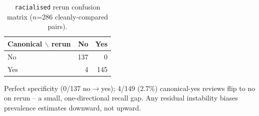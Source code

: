 \begin{table}[htbp]
\centering
\footnotesize
\setlength{\tabcolsep}{4pt}
\caption{\texttt{racialised} rerun confusion matrix ($n$=286 cleanly-compared pairs).}
\label{tab:robustness-confusion}
\begin{tabular}{@{} l r r @{}}
\toprule
Canonical $\backslash$ rerun & No & Yes \\
\midrule
No & 137 & 0 \\
Yes & 4 & 145 \\
\bottomrule
\end{tabular}

\vspace{2pt}
\raggedright\footnotesize
Perfect specificity (0/137 no$\to$yes); 4/149 (2.7\%) canonical-yes reviews flip to no on rerun -- a small, one-directional recall gap. Any residual instability biases prevalence estimates downward, not upward.
\end{table}
